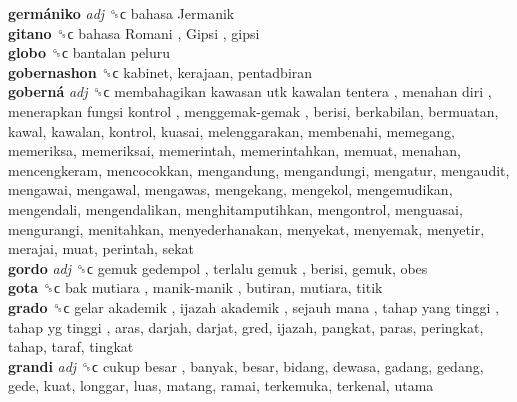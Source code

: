 \textbf{germániko} \emph{adj}  ␝ϲ   bahasa Jermanik   \\
\textbf{gitano} ␝ϲ   bahasa Romani ,  Gipsi , gipsi  \\
\textbf{globo} ␝ϲ   bantalan peluru   \\
\textbf{gobernashon} ␝ϲ  kabinet, kerajaan, pentadbiran  \\
\textbf{goberná} \emph{adj}  ␝ϲ   membahagikan kawasan utk kawalan tentera ,  menahan diri ,  menerapkan fungsi kontrol ,  menggemak-gemak , berisi, berkabilan, bermuatan, kawal, kawalan, kontrol, kuasai, melenggarakan, membenahi, memegang, memeriksa, memeriksai, memerintah, memerintahkan, memuat, menahan, mencengkeram, mencocokkan, mengandung, mengandungi, mengatur, mengaudit, mengawai, mengawal, mengawas, mengekang, mengekol, mengemudikan, mengendali, mengendalikan, menghitamputihkan, mengontrol, menguasai, mengurangi, menitahkan, menyederhanakan, menyekat, menyemak, menyetir, merajai, muat, perintah, sekat  \\
\textbf{gordo} \emph{adj}  ␝ϲ   gemuk gedempol ,  terlalu gemuk , berisi, gemuk, obes  \\
\textbf{gota} ␝ϲ   bak mutiara ,  manik-manik , butiran, mutiara, titik  \\
\textbf{grado} ␝ϲ   gelar akademik ,  ijazah akademik ,  sejauh mana ,  tahap yang tinggi ,  tahap yg tinggi , aras, darjah, darjat, gred, ijazah, pangkat, paras, peringkat, tahap, taraf, tingkat  \\
\textbf{grandi} \emph{adj}  ␝ϲ   cukup besar , banyak, besar, bidang, dewasa, gadang, gedang, gede, kuat, longgar, luas, matang, ramai, terkemuka, terkenal, utama  \\
